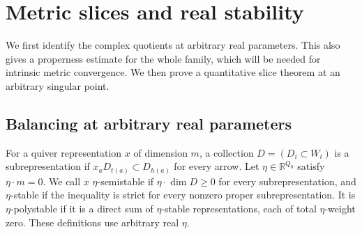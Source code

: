 \section{Metric slices and real stability}\label{sec:slices}

We first identify the complex quotients at arbitrary real parameters.
This also gives a properness estimate for the whole family, which will
be needed for intrinsic metric convergence. We then prove a quantitative
slice theorem at an arbitrary singular point.

\subsection{Balancing at arbitrary real parameters}
For a quiver representation $x$ of dimension $m$, a collection
$D=(D_i\subset W_i)$ is a subrepresentation if
$x_aD_{t(a)}\subset D_{h(a)}$ for every arrow.
Let $\eta\in\mathbb R^{Q_0}$ satisfy $\eta\cdot m=0$.
We call $x$ $\eta$-semistable if $\eta\cdot\dim D\ge0$ for every
subrepresentation, and $\eta$-stable if the inequality is strict for
every nonzero proper subrepresentation. It is $\eta$-polystable if
it is a direct sum of $\eta$-stable representations, each of total
$\eta$-weight zero. These definitions use arbitrary real $\eta$.


